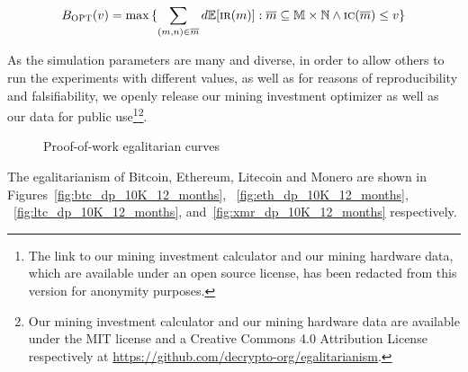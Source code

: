 \[
  B_\textsc{OPT}(v)
  =
  \max{
    \{
      \sum_{(m, n) \in \overline{m}}
      {d\mathbb{E}[\textsc{ir}(m)]}:
      \overline{m} \subseteq \mathbb{M} \times \mathbb{N}
      \land
      \textsc{ic}(\overline{m}) \leq v
    \}
  }
\]

As the simulation parameters are many and diverse, in order to allow others to
run the experiments with different values, as well as for reasons of
reproducibility and falsifiability, we openly release our mining investment
optimizer as well as our data for public use\ifanonymous\footnote{The link to our mining investment calculator and our mining hardware data,
  which are available under an open source license, has been redacted from this
  version for anonymity purposes.
}\else\footnote{Our mining investment calculator and our mining hardware data are available
  under the MIT license and a Creative Commons 4.0 Attribution License
  respectively at \url{https://github.com/decrypto-org/egalitarianism}.
}\fi.

\begin{figure}
  \caption{Proof-of-work egalitarian curves}
  \label{fig:egalitarian_curves_pow}
\end{figure}

The egalitarianism of Bitcoin, Ethereum, Litecoin and Monero are shown in
Figures~\ref{fig:btc_dp_10K_12_months}, ~\ref{fig:eth_dp_10K_12_months},
~\ref{fig:ltc_dp_10K_12_months}, and~\ref{fig:xmr_dp_10K_12_months}
respectively.

